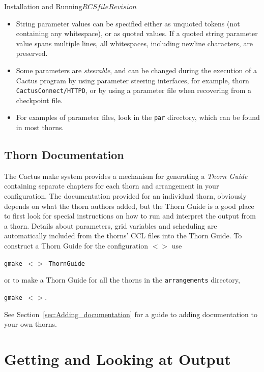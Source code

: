 \begin{cactuspart}{Installation and Running}{$RCSfile$}{$Revision$}
\begin{itemize}
\item{} String parameter values can be specified either as unquoted tokens (not
        containing any whitespace), or as quoted values. If a quoted string
        parameter value spans multiple lines, all whitespaces, including newline
        characters, are preserved.

\item{} Some parameters are \textit{steerable}, and can be changed during
        the execution of a Cactus program by using parameter steering interfaces,
        for example, thorn \texttt{CactusConnect/HTTPD}, or by using a
        parameter file when recovering from a checkpoint file.

\item{} For examples of parameter files, look in the \texttt{par} directory,
        which can be found in most thorns.

\end{itemize}

\section{Thorn Documentation}
\label{sec:thdo}

The Cactus make system provides a mechanism for generating a
\textit{Thorn Guide} containing separate chapters for each thorn and
arrangement in your configuration. The documentation provided for an
individual thorn, obviously depends on what the thorn authors added,
but the Thorn Guide is a good place to first look for special
instructions on how to run and interpret the output from a thorn.
Details about parameters, grid variables and scheduling are
automatically included from the thorns' CCL files into the Thorn
Guide. To construct a Thorn Guide for the configuration
\texttt{$<$$>$} use

\texttt{gmake $<$$>$-ThornGuide}

or to make a Thorn Guide for all the thorns in the \texttt{arrangements} directory,

\texttt{gmake $<$$>$}.

See Section~\ref{sec:Adding_documentation} for a guide to adding
documentation to your own thorns.




\chapter{Getting and Looking at Output}



\end{cactuspart}
